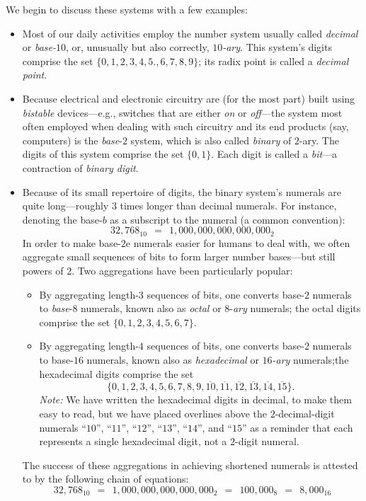 \noindent
We begin to discuss these systems with a few examples:
\begin{itemize}
\item
Most of our daily activities employ the number system usually called {\it decimal} or {\it base-$10$}, or, unusually but also correctly, {\it $10$-ary}.  This system's digits comprise the set $\{0, 1, 2, 3, 4, 5., 6, 7, 8, 9\}$; its radix point is called a {\em decimal point}.
  
 

\medskip\item
Because electrical and electronic circuitry are (for the most part) built using {\it bistable} devices---e.g., switches that are either {\em on} or {\em off}---the system most often employed when dealing with such circuitry and its end products (say, computers) is the {\it base}-$2$ system, which is also called {\it binary} of $2$-ary. The digits of this system comprise the set $\{0, 1\}$.  Each digit is called a {\it bit}---a contraction of {\it binary digit}.
 

\medskip\item
Because of its small repertoire of digits, the binary system's numerals are quite long---roughly $3$ times longer than decimal numerals.  For instance, denoting the base-$b$ as a subscript to the numeral (a common convention):
\[ 32,768_{10} \ \ = \ \ 1,000,000,000,000,000_2 \]
In order to make base-$2$e numerals easier for humans to deal with, we often aggregate small sequences of bits to form larger number bases---but still powers of $2$.  Two aggregations have been particularly popular:
  \begin{itemize}
  \item
By aggregating length-$3$ sequences of bits, one converts base-$2$ numerals to {\it base}-$8$ numerals, known also as {\it octal} or $8$-{\it ary} numerals; the octal digits comprise the set $\{0, 1, 2, 3, 4, 5, 6, 7\}$.  
  \medskip\item
By aggregating length-$4$ sequences of bits, one converts base-$2$ numerals to base-$16$ numerals, known also as {\it hexadecimal} or {\it $16$-ary} numerals;the hexadecimal digits comprise the set 
\[ \{0, 1, 2, 3, 4, 5, 6, 7, 8, 9, \overline{10}, \overline{11},
\overline{12}, \overline{13}, \overline{14}, \overline{15}\}.
\]
{\it Note:} We have written the hexadecimal digits in decimal, to make them easy to read, but we have placed overlines above the $2$-decimal-digit numerals ``$10$'', ``$11$'', ``$12$'', ``$13$'',
``$14$'', and ``$15$'' as a reminder that each represents a single hexadecimal digit, not a $2$-digit numeral.    
  \end{itemize}
The success of these aggregations in achieving shortened numerals is attested to by the following chain of equations:
\[ 32,768_{10} \ \ = \ \ 1,000,000,000,000,000_2 \ \ = \ \ 100,000_8 \ \ = \ \ 8,000_{16} \]
\end{itemize}


